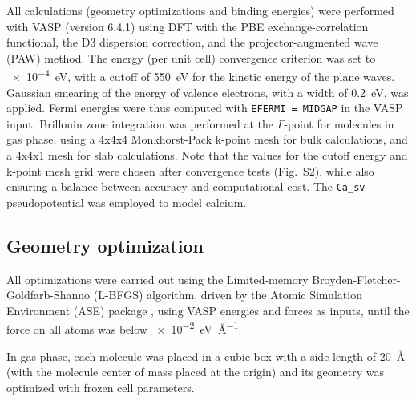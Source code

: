 \documentclass[journal=jpccck,manuscript=article]{achemso}
\begin{document}
All calculations (geometry optimizations and binding energies) were performed  with VASP (version 6.4.1) using DFT with the PBE exchange-correlation functional, the D3 dispersion correction, and the projector-augmented wave (PAW) method.\cite{blochlProjectorAugmentedwaveMethod1994} The energy  (per unit cell) convergence criterion was set to \SI{e-4}{\electronvolt}, with a cutoff of \SI{550}{\electronvolt} for the kinetic energy of the plane waves. Gaussian smearing of the energy of valence electrons, with a width of \SI{0.2}{\electronvolt}, was applied.  Fermi energies were thus computed with \texttt{EFERMI = MIDGAP} in the VASP input. Brillouin zone integration was performed at the $\Gamma$-point for molecules in gas phase, using a 4x4x4 Monkhorst-Pack k-point mesh\cite{monkhorstSpecialPointsBrillouinzone1976} for bulk calculations, and a 4x4x1 mesh for slab calculations. Note that the values for the cutoff energy and k-point mesh grid were chosen after convergence tests (Fig.~S2), while also ensuring a balance between accuracy and computational cost. The \texttt{Ca\_sv} pseudopotential\cite{blochlProjectorAugmentedwaveMethod1994,kresseUltrasoftPseudopotentialsProjector1999} was employed to model calcium.

\subsection{Geometry optimization} 
All optimizations were carried out using the Limited-memory Broyden-Fletcher-Goldfarb-Shanno  (L-BFGS) algorithm, driven by the Atomic Simulation Environment (ASE) package \cite{larsenAtomicSimulationEnvironment2017}, using VASP energies and forces as inputs, until the force on all atoms was below \SI{e-2}{\electronvolt\per\angstrom}.

In gas phase, each molecule was placed in a cubic box with a side length of \SI{20}{\angstrom} (with the molecule center of mass placed at the origin) and  its geometry was optimized with frozen cell parameters.
\end{document}
